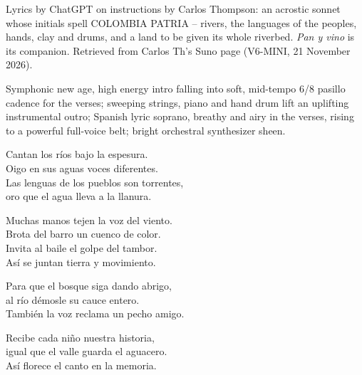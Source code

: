 
\begin{notes}
Lyrics by ChatGPT on instructions by Carlos Thompson: an acrostic sonnet whose initials spell COLOMBIA PATRIA -- rivers, the languages of the peoples, hands, clay and drums, and a land to be given its whole riverbed. \emph{Pan y vino} is its companion. Retrieved from Carlos Th's Suno page (V6-MINI, 21 November 2026).
\end{notes}
\begin{style}
Symphonic new age, high energy intro falling into soft, mid-tempo 6/8 pasillo cadence for the verses; sweeping strings, piano and hand drum lift an uplifting instrumental outro; Spanish lyric soprano, breathy and airy in the verses, rising to a powerful full-voice belt; bright orchestral synthesizer sheen.
\end{style}
\begin{lyrics}
Cantan los ríos bajo la espesura.\\
Oigo en sus aguas voces diferentes.\\
Las lenguas de los pueblos son torrentes,\\
oro que el agua lleva a la llanura.

Muchas manos tejen la voz del viento.\\
Brota del barro un cuenco de color.\\
Invita al baile el golpe del tambor.\\
Así se juntan tierra y movimiento.

Para que el bosque siga dando abrigo,\\
al río démosle su cauce entero.\\
También la voz reclama un pecho amigo.

Recibe cada niño nuestra historia,\\
igual que el valle guarda el aguacero.\\
Así florece el canto en la memoria.
\end{lyrics}

